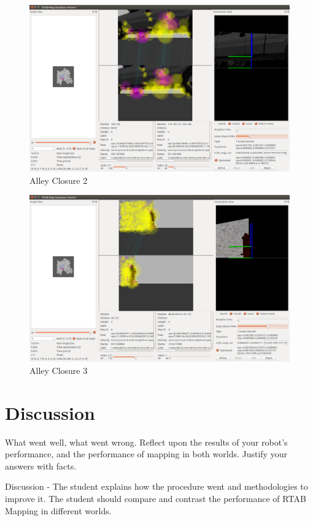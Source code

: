 \documentclass[10pt,journal,compsoc]{IEEEtran}
\begin{document}
\begin{figure}
    \centering
    \includegraphics[width=\linewidth]{alley_closure_2}
    \caption{Alley Closure 2}
    \label{fig:alley_closure_2}
\end{figure}

\begin{figure}
    \centering
    \includegraphics[width=\linewidth]{alley_closure_3}
    \caption{Alley Closure 3}
    \label{fig:alley_closure_3}
\end{figure}

\section{Discussion}
What went well, what went wrong. Reflect upon the results of your robot's performance, and the performance of mapping in both worlds. Justify your answers with facts.

Discussion - The student explains how the procedure went and methodologies to improve it. The student should compare and contrast the performance of RTAB Mapping in different worlds.
\end{document}
